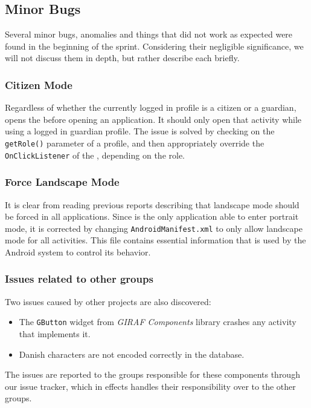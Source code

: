 \subsection{Minor Bugs}

Several minor bugs, anomalies and things that did not work as expected were found in the beginning of the sprint.
Considering their negligible significance, we will not discuss them in depth, but rather describe each briefly.

\subsubsection{Citizen Mode}
Regardless of whether the currently logged in profile is a citizen or a guardian, \launcher opens the \profileselectionactivity before opening an application.
It should only open that activity while using a logged in guardian profile.
The issue is solved by checking on the \lstinline{getRole()} parameter of a profile, and then appropriately override the \lstinline{OnClickListener} of the \profileselectionactivity, depending on the role. 

\subsubsection{Force Landscape Mode}
It is clear from reading previous reports describing \launcher that landscape mode should be forced in all \giraf applications.
Since \launcher is the only application able to enter portrait mode, it is corrected by changing \lstinline{AndroidManifest.xml} to only allow landscape mode for all activities.
This file contains essential information that is used by the Android system to control its behavior\cite{appManifest}.

\subsubsection{Issues related to other groups}
Two issues caused by other projects are also discovered:

\begin{itemize}
\item The \lstinline{GButton} widget from \textit{GIRAF Components} library crashes any activity that implements it.
\item Danish characters are not encoded correctly in the database.
\end{itemize}

The issues are reported to the groups responsible for these components through our issue tracker, which in effects handles their responsibility over to the other groups.